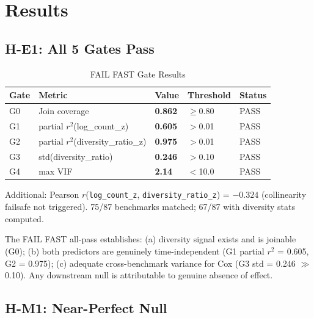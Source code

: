 \section{Results}

\subsection{H-E1: All 5 Gates Pass}

\begin{table}[h]
\centering
\caption{FAIL FAST Gate Results}
\label{tab:gate_results}
\begin{tabular}{@{}lllll@{}}
\toprule
Gate & Metric & Value & Threshold & Status \\
\midrule
G0 & Join coverage & \textbf{0.862} & $\geq$0.80 & PASS \\
G1 & partial $r^{2}$(log\_count\_z) & \textbf{0.605} & $>$0.01 & PASS \\
G2 & partial $r^{2}$(diversity\_ratio\_z) & \textbf{0.975} & $>$0.01 & PASS \\
G3 & std(diversity\_ratio) & \textbf{0.246} & $>$0.10 & PASS \\
G4 & max VIF & \textbf{2.14} & $<$10.0 & PASS \\
\bottomrule
\end{tabular}
\end{table}

Additional: Pearson $r$(\texttt{log\_count\_z}, \texttt{diversity\_ratio\_z}) = $-0.324$ (collinearity failsafe not triggered). 75/87 benchmarks matched; 67/87 with diversity stats computed.

The FAIL FAST all-pass establishes: (a) diversity signal exists and is joinable (G0); (b) both predictors are genuinely time-independent (G1 partial $r^{2}$ = 0.605, G2 = 0.975); (c) adequate cross-benchmark variance for Cox (G3 std = 0.246 $\gg$ 0.10). Any downstream null is attributable to genuine absence of effect.

\subsection{H-M1: Near-Perfect Null}

